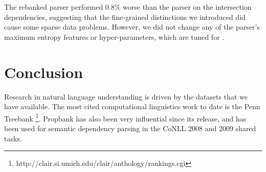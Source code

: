 \documentclass[11pt]{article}
\begin{document}
The rebanked parser performed 0.8\% worse than the \ccgbank parser on the
intersection dependencies, suggesting that the fine-grained distinctions
we introduced did cause some sparse data problems. However, we did not change any of
the parser's maximum entropy features or hyper-parameters, which are
tuned for \ccgbank.

% 
% 
% 

\section{Conclusion}

Research in natural language understanding is driven by the datasets that we
have available. The most cited computational linguistics work to date is
the Penn Treebank \citep{marcus:93}\footnote{http://clair.si.umich.edu/clair/anthology/rankings.cgi}.
Propbank \citep{propbank} has also been very influential since its release, and
\nombank has been used for semantic dependency parsing in the CoNLL 2008 and 2009 shared
tasks.
\end{document}
